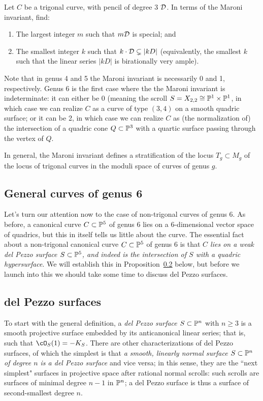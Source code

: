 \begin{exercise}
Let $C$ be a trigonal curve, with pencil of degree 3 $\cD$. In terms of the Maroni invariant, find:
\begin{enumerate}
\item The largest integer $m$ such that $m\cD$ is special; and
\item The smallest integer $k$ such that $k\cdot \cD \subsetneq |kD|$ (equivalently, the smallest $k$ such that the linear series $|kD|$ is birationally very ample).
\end{enumerate}
\end{exercise}

Note that in genus 4 and 5 the Maroni invariant is necessarily 0 and 1, respectively. Genus 6 is the first case where the the Maroni invariant is indeterminate: it can either be 0 (meaning the scroll $S = X_{2,2} \cong \PP^1 \times \PP^1$, in which case we can realize $C$ as a curve of type $(3,4)$ on a smooth quadric surface; or it can be 2, in which case we can realize $C$ as (the normalization of) the intersection of a quadric cone $Q \subset \PP^3$ with a quartic surface passing through the vertex of $Q$.

In general, the Maroni invariant defines a stratification of the locus $T_g \subset M_g$ of the locus of trigonal curves in the moduli space of curves of genus $g$.

\subsection{General curves of genus 6} Let's turn our attention now to the case of non-trigonal curves of genus 6. As before, a canonical curve $C \subset \PP^5$ of genus 6 lies on a 6-dimensional vector space of quadrics, but this in itself tells us little about the curve. The essential fact about a non-trigonal canonical curve $C \subset \PP^5$ of genus 6 is that \emph{$C$ lies on a weak del Pezzo surface $S \subset \PP^5$, and indeed is the intersection of $S$ with a quadric hypersurface}. We will establish this in Proposition~\ref{} below, but before we launch into this we should take some time to discuss del Pezzo surfaces.

\subsection{del Pezzo surfaces}

To start with the general definition, a \emph{del Pezzo surface $S \subset \PP^n$} with $n \geq 3$ is a smooth projective surface embedded by its anticanonical linear series; that is, such that $\cO_S(1) = -K_S$. There are other characterizations of del Pezzo surfaces, of which the simplest is that \emph{a smooth, linearly normal  surface $S \subset \PP^n$ of degree $n$ is a del Pezzo surface} and vice versa; in this sense, they are the ``next simplest" surfaces in projective space after rational normal scrolls: such scrolls are surfaces of minimal degree $n-1$ in $\PP^n$; a del Pezzo surface is thus a surface of second-smallest degree $n$.

